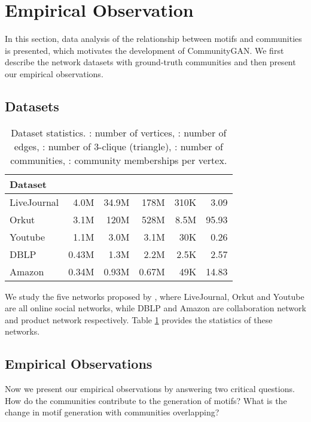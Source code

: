 \documentclass[sigconf]{acmart}
\begin{document}
\section{Empirical Observation}
In this section, data analysis of the relationship between motifs and communities is presented, which motivates the development of CommunityGAN.
We first describe the network datasets with ground-truth communities and then present our empirical observations.



\subsection{Datasets}

\begin{table}[]
\centering
\caption{Dataset statistics. : number of vertices, : number of edges, : number of 3-clique (triangle), : number of communities, : community memberships per vertex.}
\label{tab:observation-statistics}
\begin{tabular}{l||r|r|r|r|r}
Dataset      &     &     &     &    &    \\
\hline
\hline
LiveJournal  & 4.0M   & 34.9M  & 178M   & 310K  & 3.09  \\
Orkut        & 3.1M   & 120M   & 528M   & 8.5M  & 95.93 \\
Youtube      & 1.1M   & 3.0M   & 3.1M   & 30K   & 0.26  \\
DBLP         & 0.43M  & 1.3M   & 2.2M   & 2.5K  & 2.57  \\
Amazon       & 0.34M  & 0.93M  & 0.67M  & 49K   & 14.83
\end{tabular}
\end{table}

We study the five networks proposed by \citet{yang2012community}, where
LiveJournal, Orkut and Youtube are all online social networks, while
DBLP and Amazon are collaboration network and product network respectively.
Table \ref{tab:observation-statistics} provides the statistics of these networks.


\subsection{Empirical Observations}
Now we present our empirical observations by answering two critical questions.
How do the communities contribute to the generation of motifs?
What is the change in motif generation with communities overlapping?
\end{document}
